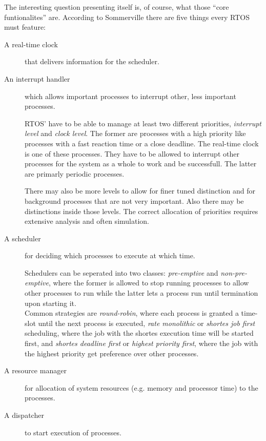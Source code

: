 \documentclass[10pt,a4paper,titlepage,draft]{scrartcl} %
\begin{document}
The interesting question presenting itself is, of course, what those ``core funtionalites'' are.
According to Sommerville there are five things every RTOS must feature:
\begin{description}
	\item[A real-time clock] that delivers information for the scheduler.
	\item[An interrupt handler] which allows important processes to interrupt other, less important processes.

	RTOS' have to be able to manage at least two different priorities, \emph{interrupt level} and \emph{clock level}.
	The former are processes with a high priority like processes with a fast reaction time or a close deadline.
	The real-time clock is one of these processes.
	They have to be allowed to interrupt other processes for the system as a whole to work and be successfull.
	The latter are primarly periodic processes.

	There may also be more levels to allow for finer tuned distinction and for background processes that are not very important. Also there may be distinctions inside those levels. The correct allocation of priorities requires extensive analysis and often simulation.
	\item[A scheduler] for deciding which processes to execute at which time.

	Schedulers can be seperated into two classes: \emph{pre-emptive} and \emph{non-pre-emptive}, where the former is allowed to stop running processes to allow other processes to run while the latter lets a process run until termination upon starting it.\\
	Common strategies are \emph{round-robin}, where each process is granted a time-slot until the next process is executed, \emph{rate monolithic} or \emph{shortes job first} scheduling, where the job with the shortes execution time will be started first, and \emph{shortes deadline first} or \emph{highest priority first}, where the job with the highest priority get preference over other processes.
	\item[A resource manager] for allocation of system resources (e.g. memory and processor time) to the processes.
	\item[A dispatcher] to start execution of processes.
\end{description}

\end{document}
